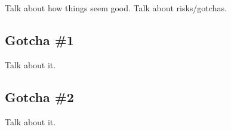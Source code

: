 Talk about how things seem good. Talk about risks/gotchas.

\subsection{Gotcha \#1}
Talk about it.

\subsection{Gotcha \#2}
Talk about it.

